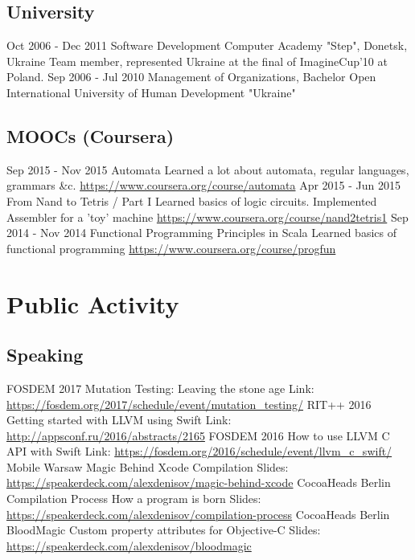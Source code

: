 \documentclass[11pt,a4paper]{moderncv}
\begin{document}
  \subsection{University}
  \cventry
    {Oct 2006 - Dec 2011}
    {Software Development}
    {Computer Academy "Step", Donetsk, Ukraine}
    {}{}
    {Team member, represented Ukraine at the final of ImagineCup'10 at Poland.}
  \cventry
    {Sep 2006 - Jul 2010}
    {Management of Organizations, Bachelor}
    {Open International University of Human Development "Ukraine"}
    {}{}{}
  \subsection{MOOCs (Coursera)}
  \cventry
    {Sep 2015 - Nov 2015}
    {Automata}
    {\newline Learned a lot about automata, regular languages, grammars \&c.}
    {}{\newline\url{https://www.coursera.org/course/automata}}{}
  \cventry
    {Apr 2015 - Jun 2015}
    {From Nand to Tetris / Part I}
    {\newline Learned basics of logic circuits. Implemented Assembler for a 'toy' machine}
    {}{\newline\url{https://www.coursera.org/course/nand2tetris1}}{}
  \cventry
    {Sep 2014 - Nov 2014}
    {Functional Programming Principles in Scala}
    {\newline Learned basics of functional programming}
    {}{\newline\url{https://www.coursera.org/course/progfun}}{}

\section{Public Activity}
  \subsection{Speaking}
  \cventry
    {FOSDEM 2017}
    {Mutation Testing: Leaving the stone age}
    {}
    {}{}
    {Link: \url{https://fosdem.org/2017/schedule/event/mutation_testing/}}
  \cventry
    {RIT++ 2016}
    {Getting started with LLVM using Swift}
    {}
    {}{}
    {Link: \url{http://appsconf.ru/2016/abstracts/2165}}
  \cventry
    {FOSDEM 2016}
    {How to use LLVM C API with Swift}
    {}
    {}{}
    {Link: \url{https://fosdem.org/2016/schedule/event/llvm_c_swift/}}
  \cventry
    {Mobile Warsaw}
    {Magic Behind Xcode}
    {Compilation}
    {}{}
    {Slides: \url{https://speakerdeck.com/alexdenisov/magic-behind-xcode}}
  \cventry
    {CocoaHeads Berlin}
    {Compilation Process}
    {How a program is born}
    {}{}
    {Slides: \url{https://speakerdeck.com/alexdenisov/compilation-process}}
  \cventry
    {CocoaHeads Berlin}
    {BloodMagic}
    {Custom property attributes for Objective-C}
    {}{}
    {Slides: \url{https://speakerdeck.com/alexdenisov/bloodmagic}}
\end{document}
